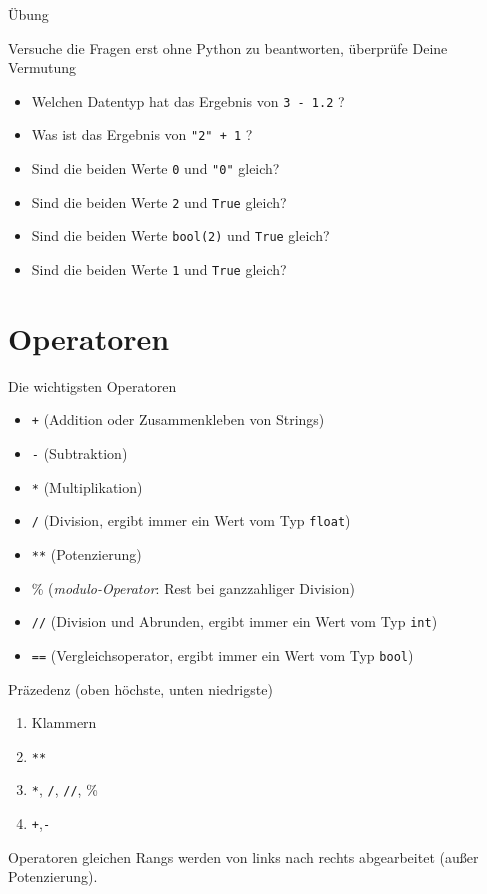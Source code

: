 \documentclass[algorithm,pgfplots,colortheme=dark]{cuzbeamer}
\newcommand{\py}[1]{\texttt{#1}}
\newcommand{\pybw}[1]{\texttt{#1}}
\begin{document}
\begin{frame}{Übung}

\begin{block}{Versuche die Fragen erst ohne Python zu beantworten, überprüfe Deine Vermutung}
	\begin{itemize}
		\item Welchen Datentyp hat das Ergebnis von \py{3 - 1.2} ?
		\item Was ist das Ergebnis von \py{"2" + 1} ? 
		\item Sind die beiden Werte \py{0} und \py{"0"} gleich? 
		\item Sind die beiden Werte \py{2} und \py{True} gleich? 
		\item Sind die beiden Werte \py{bool(2)} und \py{True} gleich? 
		\item Sind die beiden Werte \py{1} und \py{True} gleich? 
	\end{itemize}
\end{block}


\end{frame}


\section{Operatoren}

\begin{frame}
\begin{block}{Die wichtigsten Operatoren}
	\begin{itemize}
		\item \pybw{+} (Addition oder Zusammenkleben von Strings)
		\item \pybw{-} (Subtraktion)
		\item \pybw{*} (Multiplikation)
		\item \pybw{/} (Division, ergibt immer ein Wert vom Typ \pybw{float})
		\item \pybw{**} (Potenzierung)
			\item \% (\textit{modulo-Operator}: Rest bei ganzzahliger Division)
		\item \pybw{//} (Division und Abrunden, ergibt immer ein Wert vom Typ \pybw{int})
		\item \pybw{==} (Vergleichsoperator, ergibt immer ein Wert vom Typ \pybw{bool})
	\end{itemize}
\end{block}
\end{frame}

\begin{frame}
\begin{block}{Präzedenz (oben höchste, unten niedrigste)}
	\begin{enumerate}
		\item Klammern
		\item \pybw{**}
		\item \pybw{*}, \pybw{/}, \pybw{//}, \%
		\item \pybw{+},\pybw{-}
	\end{enumerate}	
Operatoren gleichen Rangs werden von links nach rechts abgearbeitet (außer Potenzierung). 
\end{block}
\end{frame}
\end{document}
